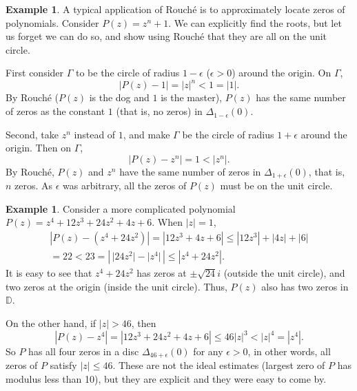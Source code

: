 \documentclass[12pt,openany]{book}
\newcommand{\sabs}[1]{\lvert {#1} \rvert}
\newcommand{\abs}[1]{\left\lvert {#1} \right\rvert}
\newcommand{\D}{{\mathbb{D}}}
\theoremstyle{plain}
\theoremstyle{remark}
\theoremstyle{definition}
\theoremstyle{exercise}
\theoremstyle{example}
\newtheorem{example}[thm]{Example}
\begin{document}
\begin{example}
A typical application of Rouch\'e is to approximately locate zeros of
polynomials.  Consider $P(z) = z^n + 1$.  We can explicitly find the roots,
but let us forget we can do so,
and show using Rouch\'e that they are all on the unit circle.

First
consider $\Gamma$ to be the circle of radius $1-\epsilon$ ($\epsilon > 0$)
around the origin.  On $\Gamma$,
\begin{equation*}
\abs{P(z) - 1} = \abs{z}^n < 1 = \sabs{1}.
\end{equation*}
By Rouch\'e ($P(z)$ is the dog and $1$ is the master), $P(z)$
has the same number of zeros as the constant $1$ (that is, no zeros) in
$\Delta_{1-\epsilon}(0)$.

Second, take $z^n$ instead of $1$, and make $\Gamma$ be the circle of
radius $1+\epsilon$ around the origin.  Then on $\Gamma$,
\begin{equation*}
\abs{P(z) - z^n} = 1 < \abs{z^n} .
\end{equation*}
By Rouch\'e, $P(z)$ and $z^n$ have the same number of zeros in
$\Delta_{1+\epsilon}(0)$, that is, $n$ zeros.  As $\epsilon$ was arbitrary,
all the zeros of $P(z)$ must be on the unit circle.
\end{example}

\begin{example}
Consider a more complicated polynomial $P(z) = z^4+12z^3+24z^2+4z+6$.
When $\sabs{z}=1$,
\begin{multline*}
\abs{P(z)-(z^4+24z^2)} =
\abs{12z^3+4z+6} \leq
\abs{12z^3}+\abs{4z}+\abs{6} \\
= 22 < 23 = \abs{\,\sabs{24 z^2} - \sabs{z^4}\,}
\leq \abs{z^4+24z^2} .
\end{multline*}
It is easy to see that $z^4+24z^2$ has zeros at $\pm \sqrt{24} i$ (outside
the unit circle), and two zeros at the origin (inside the unit circle).
Thus, $P(z)$ also has two zeros in $\D$.

On the other hand, if $\sabs{z} > 46$, then
\begin{equation*}
\abs{P(z)-z^4} = \abs{12z^3+24z^2+4z+6}
\leq 46 \sabs{z}^3 < {\sabs{z}}^4 = \abs{z^4}.
\end{equation*}
So $P$ has all four zeros in a disc $\Delta_{46+\epsilon}(0)$ for any
$\epsilon > 0$,
in other words, all zeros of $P$ satisfy $\sabs{z} \leq 46$.
These are not the ideal estimates (largest zero of $P$ has modulus less than
10), but they are explicit and they were easy to come by.
\end{example}
\end{document}

